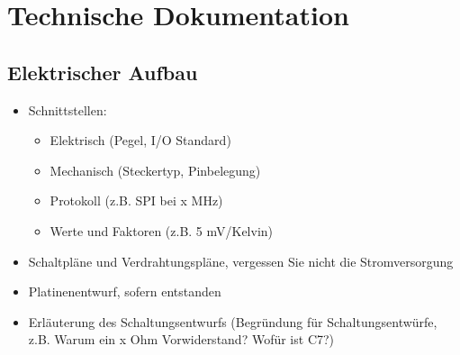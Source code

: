 \newpage
\section{Technische Dokumentation}
\subsection{Elektrischer Aufbau}
\begin{itemize}
    \item Schnittstellen:
    \begin{itemize}
        \item Elektrisch (Pegel, I/O Standard)
        \item Mechanisch (Steckertyp, Pinbelegung)
        \item Protokoll (z.B. SPI bei x MHz)
        \item Werte und Faktoren (z.B. 5 mV/Kelvin)
    \end{itemize}
    \item Schaltpläne und Verdrahtungspläne, vergessen Sie nicht die Stromversorgung
    \item Platinenentwurf, sofern entstanden
    \item Erläuterung des Schaltungsentwurfs (Begründung für Schaltungsentwürfe, z.B. Warum ein x Ohm Vorwiderstand? Wofür ist C7?)
\end{itemize}